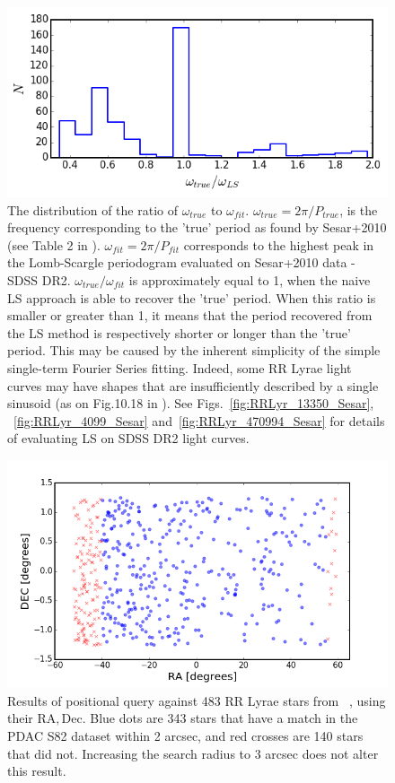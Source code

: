 \documentclass[DM,lsstdraft,toc,usenatbib]{lsstdoc}
\begin{document}
\begin{figure}
\begin{centering}
\includegraphics[width=0.7\columnwidth]{figs/Fig_3_RRLyr_omega_ratio}
\caption{The distribution of the ratio of $\omega_{true}$ to $\omega_{fit}$.  $\omega_{true} = 2 \pi / P_{true}$, is the frequency corresponding to the 'true' period as found by Sesar+2010 (see Table 2 in \citep{sesar2010}).  $\omega_{fit} = 2 \pi / P_{fit}$ corresponds to the highest peak in the Lomb-Scargle periodogram evaluated on Sesar+2010 data  - SDSS DR2.  $\omega_{true} /  \omega_{fit}$ is approximately equal to 1, when the naive  LS approach is able to recover the 'true' period.  When this ratio is smaller or greater than 1, it means that the period recovered from the LS method is  respectively shorter or longer than the 'true' period. This may be caused by the inherent simplicity of the simple single-term Fourier Series fitting. Indeed, some RR Lyrae light curves may have shapes that are insufficiently described by a single sinusoid (as on Fig.10.18  in \citep{ivezic2014}). See Figs.~\ref{fig:RRLyr_13350_Sesar}, ~\ref{fig:RRLyr_4099_Sesar} and~\ref{fig:RRLyr_470994_Sesar} for details of evaluating LS on SDSS DR2 light curves.}
\label{fig:RRLyr_period_ratios}
\end{centering}
\end{figure}

\begin{figure}
\includegraphics[width=\columnwidth]{figs/missing_and_recovered_RR_Lyr_PDAC}
\caption{Results of positional query against 483 RR Lyrae stars from ~\citep{sesar2010}, using their $\mathrm{RA}, \mathrm{Dec}$. Blue dots are 343 stars that have a match in the PDAC S82 dataset within 2 arcsec, and red crosses are 140 stars that did not. Increasing the search radius to 3 arcsec does not alter this result. }
\label{fig:PDAC_query_ra_dec}
\end{figure}
\end{document}
